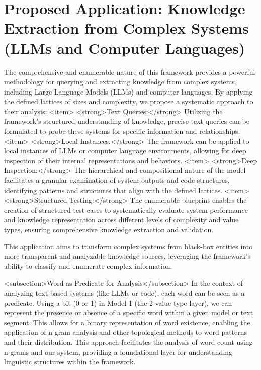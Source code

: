 \section{Proposed Application: Knowledge Extraction from Complex Systems (LLMs and Computer Languages)}
The comprehensive and enumerable nature of this framework provides a powerful methodology for querying and extracting knowledge from complex systems, including Large Language Models (LLMs) and computer languages. By applying the defined lattices of sizes and complexity, we propose a systematic approach to their analysis:
    <item>    <strong>Text Queries:</strong> Utilizing the framework's structured understanding of knowledge, precise text queries can be formulated to probe these systems for specific information and relationships.
    <item>    <strong>Local Instances:</strong> The framework can be applied to local instances of LLMs or computer language environments, allowing for deep inspection of their internal representations and behaviors.
    <item>    <strong>Deep Inspection:</strong> The hierarchical and compositional nature of the model facilitates a granular examination of system outputs and code structures, identifying patterns and structures that align with the defined lattices.
    <item>    <strong>Structured Testing:</strong> The enumerable blueprint enables the creation of structured test cases to systematically evaluate system performance and knowledge representation across different levels of complexity and value types, ensuring comprehensive knowledge extraction and validation.

This application aims to transform complex systems from black-box entities into more transparent and analyzable knowledge sources, leveraging the framework's ability to classify and enumerate complex information.

<subsection>Word as Predicate for Analysis</subsection>
In the context of analyzing text-based systems (like LLMs or code), each word can be seen as a predicate. Using a bit (0 or 1) in Model 1 (the 2-value type layer), we can represent the presence or absence of a specific word within a given model or text segment. This allows for a binary representation of word existence, enabling the application of n-gram analysis and other topological methods to word patterns and their distribution. This approach facilitates the analysis of word count using n-grams and our system, providing a foundational layer for understanding linguistic structures within the framework.
